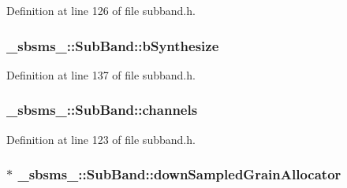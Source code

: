Definition at line 126 of file subband.\+h.

\subsubsection[{\texorpdfstring{b\+Synthesize}{bSynthesize}}]{ \+\_\+sbsms\+\_\+\+::\+Sub\+Band\+::b\+Synthesize\hspace{0.3cm}{\ttfamily [protected]}}\hypertarget{class__sbsms___1_1_sub_band_aed18bd90e1aa01d4b744ad43e3d52563}{}\label{class__sbsms___1_1_sub_band_aed18bd90e1aa01d4b744ad43e3d52563}


Definition at line 137 of file subband.\+h.

\subsubsection[{\texorpdfstring{channels}{channels}}]{ \+\_\+sbsms\+\_\+\+::\+Sub\+Band\+::channels\hspace{0.3cm}{\ttfamily [protected]}}\hypertarget{class__sbsms___1_1_sub_band_a696155e930117037f0cab10fe5368c37}{}\label{class__sbsms___1_1_sub_band_a696155e930117037f0cab10fe5368c37}


Definition at line 123 of file subband.\+h.

\subsubsection[{\texorpdfstring{down\+Sampled\+Grain\+Allocator}{downSampledGrainAllocator}}]{$\ast$ \+\_\+sbsms\+\_\+\+::\+Sub\+Band\+::down\+Sampled\+Grain\+Allocator\hspace{0.3cm}{\ttfamily [protected]}}\hypertarget{class__sbsms___1_1_sub_band_a8ad030b3bc67592a284eaadcd9a929dd}{}\label{class__sbsms___1_1_sub_band_a8ad030b3bc67592a284eaadcd9a929dd}


